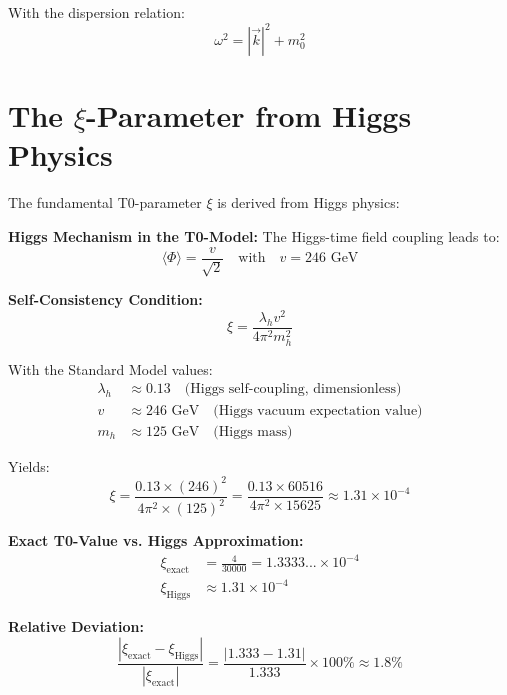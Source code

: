 \documentclass[12pt,a4paper]{report}
\newcommand{\xipar}{\xi}      %
\begin{document}
With the dispersion relation:
\begin{equation}
	\omega^2 = |\vec{k}|^2 + m_0^2
\end{equation}

\section{The $\xipar$-Parameter from Higgs Physics}\label{sec:xi_higgs_derivation}

The fundamental T0-parameter $\xipar$ is derived from Higgs physics:

\textbf{Higgs Mechanism in the T0-Model:}
The Higgs-time field coupling leads to:
\begin{equation}
	\langle \Phi \rangle = \frac{v}{\sqrt{2}} \quad \text{with} \quad v = 246 \text{ GeV}
\end{equation}

\textbf{Self-Consistency Condition:}
\begin{equation}
	\xipar = \frac{\lambda_h v^2}{4\pi^2 m_h^2}
\end{equation}

With the Standard Model values:
\begin{align}
	\lambda_h &\approx 0.13 \quad \text{(Higgs self-coupling, dimensionless)} \\
	v &\approx 246 \text{ GeV} \quad \text{(Higgs vacuum expectation value)} \\
	m_h &\approx 125 \text{ GeV} \quad \text{(Higgs mass)}
\end{align}

Yields:
\begin{equation}
	\xipar = \frac{0.13 \times (246)^2}{4\pi^2 \times (125)^2} = \frac{0.13 \times 60516}{4\pi^2 \times 15625} \approx 1.31 \times 10^{-4}
\end{equation}

\textbf{Exact T0-Value vs. Higgs Approximation:}
\begin{align}
	\xipar_{\text{exact}} &= \frac{4}{30000} = 1.3333... \times 10^{-4} \\
	\xipar_{\text{Higgs}} &\approx 1.31 \times 10^{-4}
\end{align}

\textbf{Relative Deviation:}
\begin{equation}
	\frac{|\xipar_{\text{exact}} - \xipar_{\text{Higgs}}|}{|\xipar_{\text{exact}}|} = \frac{|1.333 - 1.31|}{1.333} \times 100\% \approx 1.8\%
\end{equation}
\end{document}
